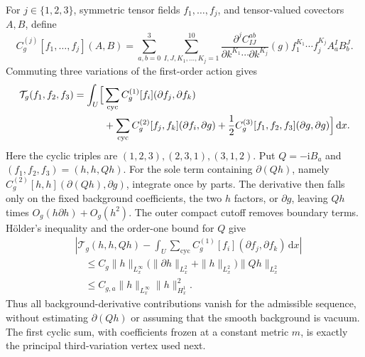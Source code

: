 \documentclass[11pt,a4paper]{article}
\numberwithin{equation}{section}
\newcommand{\dd}{\mathrm d}
\newcommand{\f}[2]{\frac{#1}{#2}}
\newcommand{\ii}{\mathrm{i}}
\theoremstyle{definition}
\begin{document}
For $j\in\{1,2,3\}$, symmetric tensor fields $f_1,\ldots,f_j$,
and tensor-valued covectors $A,B$, define
\begin{equation*}
C_g^{(j)}[f_1,\ldots,f_j](A,B)
=\sum_{a,b=0}^3\sum_{I,J,K_1,\ldots,K_j=1}^{10}
\f{\partial^j C_{IJ}^{ab}}{\partial k^{K_1}\cdots\partial k^{K_j}}(g)
f_1^{K_1}\cdots f_j^{K_j} A_a^I B_b^J.
\end{equation*}
Commuting three variations of the first-order action gives
\begin{equation*}
\begin{split}
\mathcal T_g(f_1,f_2,f_3)=\int_U\Bigl[&
 \sum_{\mathrm{cyc}} C_g^{(1)}[f_i](\partial f_j,\partial f_k)\\
&+\sum_{\mathrm{cyc}} C_g^{(2)}[f_j,f_k](\partial f_i,\partial g)
 +\f12 C_g^{(3)}[f_1,f_2,f_3](\partial g,\partial g)\Bigr]\,\dd x.
\end{split}
\end{equation*}
Here the cyclic triples are $(1,2,3),(2,3,1),(3,1,2)$.
Put $Q=-\ii B_a$ and $(f_1,f_2,f_3)=(h,h,Qh)$.
For the sole term containing $\partial(Qh)$, namely
$C_g^{(2)}[h,h](\partial(Qh),\partial g)$, integrate once by parts.
The derivative then falls only on the fixed background coefficients,
the two $h$ factors, or $\partial g$, leaving $Qh$ times
$O_g(h\partial h)+O_g(h^2)$. The outer compact cutoff removes
boundary terms. H\"older's inequality and the order-one bound for $Q$ give
\begin{equation*}
\begin{aligned}
&\left|\mathcal T_g(h,h,Qh)
-\int_U\sum_{\mathrm{cyc}}
 C_g^{(1)}[f_i](\partial f_j,\partial f_k)\,\dd x\right|\\
&\quad\leq C_g\|h\|_{L^\infty_x}
 \bigg(\|\partial h\|_{L^2_x}+\|h\|_{L^2_x}\bigg)
 \|Qh\|_{L^2_x}\\
&\quad\leq C_{g,a}\|h\|_{L^\infty_x}\|h\|_{H^1_x}^2.
\end{aligned}
\end{equation*}
Thus all background-derivative contributions vanish
for the admissible sequence, without estimating $\partial(Qh)$ or
assuming that the smooth background is vacuum. The first cyclic sum,
with coefficients frozen at a constant metric $m$, is exactly the
principal third-variation vertex used next.
\end{document}
